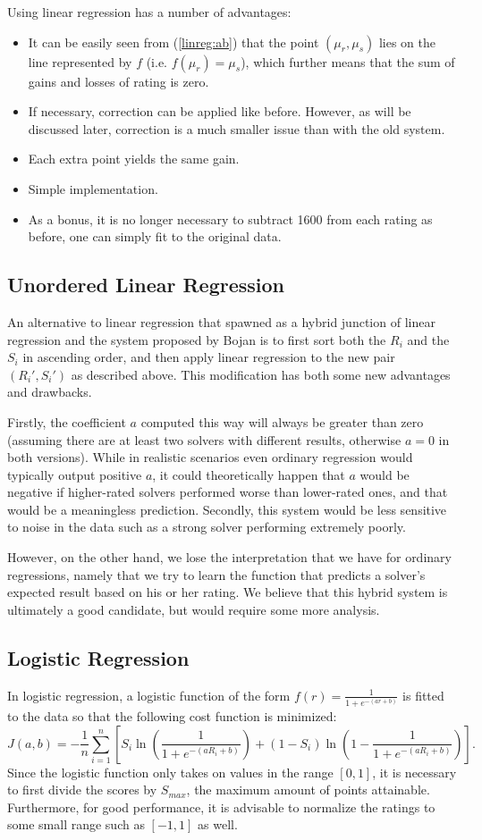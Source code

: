 \documentclass{article}
\newcommand{\artg}{\mu_r}
\newcommand{\ascr}{\mu_s}
\begin{document}
Using linear regression has a number of advantages:
\begin{itemize}
\item It can be easily seen from (\ref{linreg:ab}) that the point $(\artg, \ascr)$ lies on the line represented by $f$ (i.e. $f(\artg)=\ascr$), which further means that the sum of gains and losses of rating is zero.
\item If necessary, correction can be applied like before. However, as will be discussed later, correction is a much smaller issue than with the old system.
\item Each extra point yields the same gain.
\item Simple implementation.
\item As a bonus, it is no longer necessary to subtract 1600 from each rating as before, one can simply fit to the original data.
\end{itemize}

\subsection{Unordered Linear Regression}
An alternative to linear regression that spawned as a hybrid junction of linear regression and the system proposed by Bojan is to first sort both the $R_i$ and the $S_i$ in ascending order, and then apply linear regression to the new pair $(R_i',S_i')$ as described above.
This modification has both some new advantages and drawbacks.

Firstly, the coefficient $a$ computed this way will always be greater than zero (assuming there are at least two solvers with different results, otherwise $a=0$ in both versions).
While in realistic scenarios even ordinary regression would typically output positive $a$, it could theoretically happen that $a$ would be negative if higher-rated solvers performed worse than lower-rated ones, and that would be a meaningless prediction.
Secondly, this system would be less sensitive to noise in the data such as a strong solver performing extremely poorly.

However, on the other hand, we lose the interpretation that we have for ordinary regressions, namely that we try to learn the function that predicts a solver's expected result based on his or her rating.
We believe that this hybrid system is ultimately a good candidate, but would require some more analysis.

\subsection{Logistic Regression}
In logistic regression, a logistic function of the form $f(r)=\frac{1}{1+e^{-(ar+b)}}$ is fitted to the data so that the following cost function is minimized:
\[J(a,b)=-\frac{1}{n}\sum_{i=1}^n \left[S_i\ln\left(\frac{1}{1+e^{-(aR_i+b)}}\right) + (1-S_i)\ln\left(1-\frac{1}{1+e^{-(aR_i+b)}}\right)\right].\]
Since the logistic function only takes on values in the range $[0,1]$, it is necessary to first divide the scores by $S_{max}$, the maximum amount of points attainable.
Furthermore, for good performance, it is advisable to normalize the ratings to some small range such as $[-1,1]$ as well.
\end{document}
